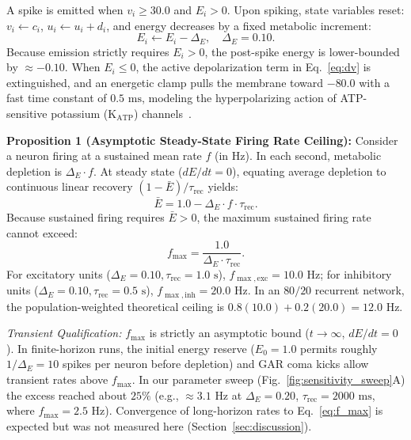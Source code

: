 \documentclass[journal]{IEEEtran}
\begin{document}
A spike is emitted when $v_i \ge 30.0$ and $E_i > 0$. Upon spiking, state variables reset: $v_i \leftarrow c_i$, $u_i \leftarrow u_i + d_i$, and energy decreases by a fixed metabolic increment:
\begin{equation}
E_i \leftarrow E_i - \Delta_E, \quad \Delta_E = 0.10.
\label{eq:E_deplete}
\end{equation}
Because emission strictly requires $E_i > 0$, the post-spike energy is lower-bounded by $\approx -0.10$. When $E_i \le 0$, the active depolarization term in Eq.~\eqref{eq:dv} is extinguished, and an energetic clamp pulls the membrane toward $-80.0$ with a fast time constant of $0.5\text{ ms}$, modeling the hyperpolarizing action of ATP-sensitive potassium ($\mathrm{K}_{\mathrm{ATP}}$) channels~\cite{Tanner2011}.

\textbf{Proposition 1 (Asymptotic Steady-State Firing Rate Ceiling):}
Consider a neuron firing at a sustained mean rate $f$ (in Hz). In each second, metabolic depletion is $\Delta_E \cdot f$. At steady state ($dE/dt = 0$), equating average depletion to continuous linear recovery $(1 - \bar{E}) / \tau_{\mathrm{rec}}$ yields:
\begin{equation}
\bar{E} = 1.0 - \Delta_E \cdot f \cdot \tau_{\mathrm{rec}}.
\label{eq:E_ss}
\end{equation}
Because sustained firing requires $\bar{E} > 0$, the maximum sustained firing rate cannot exceed:
\begin{equation}
f_{\max} = \frac{1.0}{\Delta_E \cdot \tau_{\mathrm{rec}}}.
\label{eq:f_max}
\end{equation}
For excitatory units ($\Delta_E = 0.10, \tau_{\mathrm{rec}} = 1.0\text{ s}$), $f_{\max,\mathrm{exc}} = 10.0\text{ Hz}$; for inhibitory units ($\Delta_E = 0.10, \tau_{\mathrm{rec}} = 0.5\text{ s}$), $f_{\max,\mathrm{inh}} = 20.0\text{ Hz}$. In an $80/20$ recurrent network, the population-weighted theoretical ceiling is $0.8(10.0) + 0.2(20.0) = 12.0\text{ Hz}$.

\emph{Transient Qualification:} $f_{\max}$ is strictly an asymptotic bound ($t \to \infty$, $dE/dt = 0$). In finite-horizon runs, the initial energy reserve ($E_0 = 1.0$ permits roughly $1/\Delta_E = 10$ spikes per neuron before depletion) and GAR coma kicks allow transient rates above $f_{\max}$. In our parameter sweep (Fig.~\ref{fig:sensitivity_sweep}A) the excess reached about $25\%$ (e.g., $\approx 3.1\text{ Hz}$ at $\Delta_E = 0.20$, $\tau_{\mathrm{rec}} = 2000\text{ ms}$, where $f_{\max} = 2.5\text{ Hz}$). Convergence of long-horizon rates to Eq.~\eqref{eq:f_max} is expected but was not measured here (Section~\ref{sec:discussion}).
\end{document}

